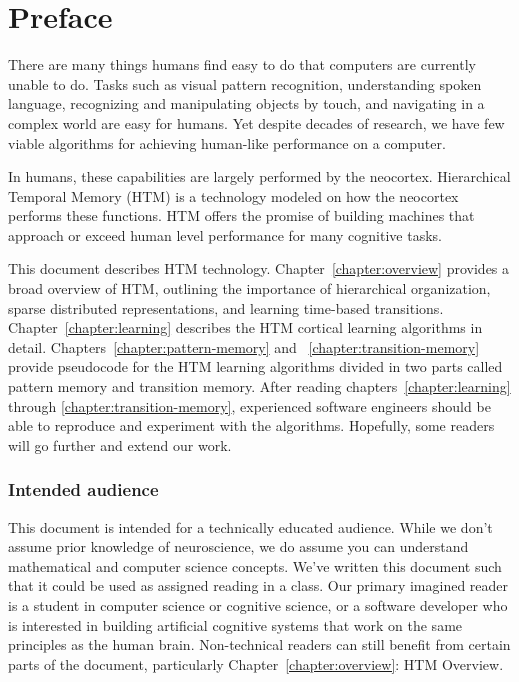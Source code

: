 \chapter*{Preface}

There are many things humans find easy to do that computers are
currently unable to do. Tasks such as visual pattern recognition,
understanding spoken language, recognizing and manipulating objects by
touch, and navigating in a complex world are easy for humans. Yet
despite decades of research, we have few viable algorithms for
achieving human-like performance on a computer.

In humans, these capabilities are largely performed by the
neocortex. Hierarchical Temporal Memory (HTM) is a technology modeled
on how the neocortex performs these functions. HTM offers the promise
of building machines that approach or exceed human level performance
for many cognitive tasks.

This document describes HTM technology. Chapter~\ref{chapter:overview}
provides a broad overview of HTM, outlining the importance of
hierarchical organization, sparse distributed representations, and
learning time-based transitions. Chapter~\ref{chapter:learning}
describes the HTM cortical learning algorithms in
detail. Chapters~\ref{chapter:pattern-memory} and ~\ref{chapter:transition-memory}
provide pseudocode for the HTM learning
algorithms divided in two parts called pattern memory and transition
memory. After reading chapters~\ref{chapter:learning} through
\ref{chapter:transition-memory}, experienced software engineers should
be able to reproduce and experiment with the algorithms. Hopefully,
some readers will go further and extend our work.

\subsection*{Intended audience}

This document is intended for a technically educated audience. While
we don't assume prior knowledge of neuroscience, we do assume you can
understand mathematical and computer science concepts. We've written
this document such that it could be used as assigned reading in a
class. Our primary imagined reader is a student in computer science or
cognitive science, or a software developer who is interested in
building artificial cognitive systems that work on the same principles
as the human brain.  Non-technical readers can still benefit from
certain parts of the document, particularly
Chapter~\ref{chapter:overview}: HTM Overview.

